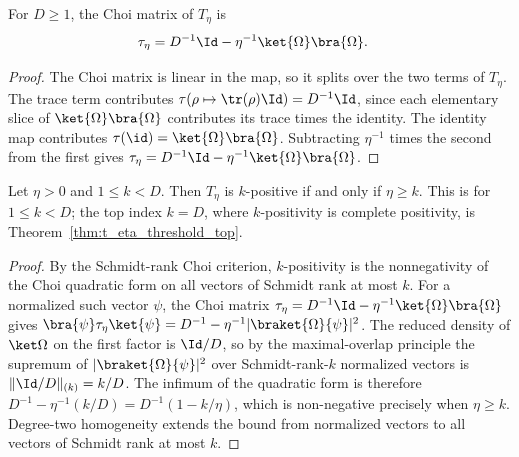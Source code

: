\begin{theorem}
    \label{thm:choi_matrix_t_eta}
    \leanok
    For $D\ge 1$, the Choi matrix of $T_\eta$ is
    \begin{align}
        \tau_\eta & =D^{-1}\Id-\eta^{-1}\ket{\Omega}\bra{\Omega}.
        \notag
    \end{align}
\end{theorem}

\begin{proof}
    \leanok
    The Choi matrix is linear in the map, so it splits over the two terms of
    $T_\eta$. The trace term contributes
    $\tau(\rho\mapsto\tr(\rho) \Id)=D^{-1}\Id$, since each elementary
    slice of $\ket{\Omega}\bra{\Omega}$ contributes its trace times the identity.
    The identity map contributes
    $\tau(\id)=\ket{\Omega}\bra{\Omega}$. Subtracting $\eta^{-1}$ times the
    second from the first gives
    $\tau_\eta=D^{-1}\Id-\eta^{-1}\ket{\Omega}\bra{\Omega}$.
\end{proof}

\begin{theorem}
    \label{thm:t_eta_threshold}
    \leanok
    Let $\eta>0$ and $1\le k<D$. Then $T_\eta$ is $k$-positive if and only if
    $\eta\ge k$. This is \cite[Equation~(3.11)]{Wolf2012Quantum} for $1\le k<D$;
    the top index $k=D$, where $k$-positivity is complete positivity, is
    Theorem~\ref{thm:t_eta_threshold_top}.
\end{theorem}

\begin{proof}
    \leanok
    By the Schmidt-rank Choi criterion, $k$-positivity is the nonnegativity of
    the Choi quadratic form on all vectors of Schmidt rank at most $k$. For a
    normalized such vector $\psi$, the Choi matrix
    $\tau_\eta=D^{-1}\Id-\eta^{-1}\ket{\Omega}\bra{\Omega}$ gives
    $\bra{\psi}\tau_\eta\ket{\psi}
        =D^{-1}-\eta^{-1}|\braket{\Omega}{\psi}|^2$.
    The reduced density of $\ket\Omega$ on the first factor is $\Id/D$, so by the
    maximal-overlap principle the supremum of $|\braket{\Omega}{\psi}|^2$ over
    Schmidt-rank-$k$ normalized vectors is $\|\Id/D\|_{(k)}=k/D$. The infimum of
    the quadratic form is therefore $D^{-1}-\eta^{-1}(k/D)=D^{-1}(1-k/\eta)$,
    which is non-negative precisely when $\eta\ge k$. Degree-two homogeneity
    extends the bound from normalized vectors to all vectors of Schmidt rank at
    most $k$.
\end{proof}

